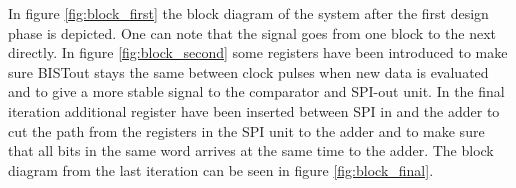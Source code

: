 
In figure \ref{fig:block_first} the block diagram of the system after the first design phase is depicted. One can note that the signal goes from one block to the next directly. In figure \ref{fig:block_second} some registers have been introduced to make sure BISTout stays the same between clock pulses when new data is evaluated and to give a more stable signal to the comparator and SPI-out unit. In the final iteration additional register have been inserted between SPI in and the adder to cut the path from the registers in the SPI unit to the adder and to make sure that all bits in the same word arrives at the same time to the adder. The block diagram from the last iteration can be seen in figure \ref{fig:block_final}.
